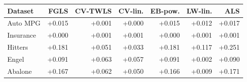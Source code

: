 \begin{tabular}{@{}lrrrrrr@{}}
\toprule
Dataset & FGLS & CV-TWLS & CV-lin. & EB-pow. & LW-lin. & ALS \\
\midrule
Auto MPG & +0.015 & +0.001 & +0.000 & +0.015 & +0.012 & +0.017 \\
Insurance & +0.000 & +0.001 & +0.001 & +0.000 & +0.001 & +0.001 \\
Hitters & +0.181 & +0.051 & +0.033 & +0.181 & +0.117 & +0.251 \\
Engel & +0.091 & +0.063 & +0.057 & +0.091 & +0.002 & +0.090 \\
Abalone & +0.167 & +0.062 & +0.050 & +0.166 & +0.009 & +0.171 \\
\bottomrule
\end{tabular}
